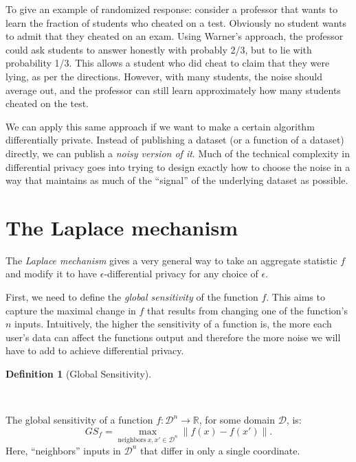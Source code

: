 \documentclass[
  letterpaper,
]{scrbook}
\newcommand{\R}{\mathbb{R}}
\newcommand{\calD}{\mathcal{D}}
\theoremstyle{definition}
\newtheorem{definition}{Definition}[chapter]
\theoremstyle{plain}
\theoremstyle{plain}
\theoremstyle{remark}
\begin{document}
To give an example of randomized response: consider a professor that
wants to learn the fraction of students who cheated on a test. Obviously
no student wants to admit that they cheated on an exam. Using Warner's
approach, the professor could ask students to answer honestly with
probably 2/3, but to lie with probability 1/3. This allows a student who
did cheat to claim that they were lying, as per the directions. However,
with many students, the noise should average out, and the professor can
still learn approximately how many students cheated on the test.

We can apply this same approach if we want to make a certain algorithm
differentially private. Instead of publishing a dataset (or a function
of a dataset) directly, we can publish a \emph{noisy version of it}.
Much of the technical complexity in differential privacy goes into
trying to design exactly how to choose the noise in a way that maintains
as much of the ``signal'' of the underlying dataset as possible.

\section{The Laplace mechanism}\label{the-laplace-mechanism}

The \emph{Laplace mechanism} gives a very general way to take an
aggregate statistic \(f\) and modify it to have
\(\epsilon\)-differential privacy for any choice of \(\epsilon\).

First, we need to define the \emph{global sensitivity} of the function
\(f\). This aims to capture the maximal change in \(f\) that results
from changing one of the function's \(n\) inputs. Intuitively, the
higher the sensitivity of a function is, the more each user's data can
affect the functions output and therefore the more noise we will have to
add to achieve differential privacy.

\begin{definition}[Global
Sensitivity]\protect\hypertarget{def-global-sensitivity}{}\label{def-global-sensitivity}

~


The global sensitivity of a function \(f \colon \calD^n \to \R\), for
some domain \(\calD\), is:
\[ GS_f = \max_{\text{neighbors}~x, x' \in \calD^n} \| f(x) - f(x') \|. \]
Here, ``neighbors'' inputs in \(\calD^n\) that differ in only a single
coordinate.

\end{definition}
\end{document}
